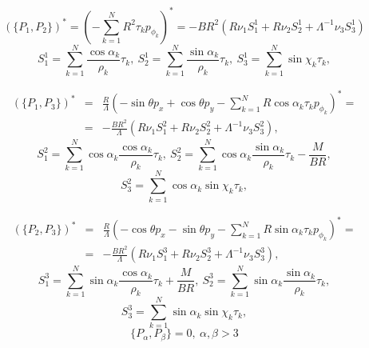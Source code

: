 $$
(\{P_1,P_2\})^* = (-\sum\limits_{k=1}^{N} R^2\tau_kp_{\phi_k})^* =
-BR^2(R\nu_1 S_1^1 + R\nu_2 S_2^1 + \Lambda^{-1}\nu_3S_3^1)$$
$$
S_1^1 = \sum\limits_{k=1}^{N}\frac{\cos\alpha_k}{\rho_k}\tau_k,\
S_2^1 = \sum\limits_{k=1}^{N}\frac{\sin\alpha_k}{\rho_k}\tau_k,\
S_3^1 = \sum\limits_{k=1}^{N}\sin\chi_k\tau_k,
$$

\begin{eqnarray*}
(\{P_1,P_3\})^* &=& \frac{R}{\Lambda}\left(-\sin\theta p_x + \cos\theta p_y - \sum\limits_{k=1}^{N} R\cos\alpha_k\tau_kp_{\phi_k}\right)^* =\\
&=& -\frac{BR^2}{\Lambda}(R\nu_1 S_1^2 + R\nu_2 S_2^2 + \Lambda^{-1}\nu_3S_3^2),
\end{eqnarray*}
$$
S_1^2 = \sum\limits_{k=1}^{N}\cos\alpha_k\frac{\cos\alpha_k}{\rho_k}\tau_k,\
S_2^2 = \sum\limits_{k=1}^{N}\cos\alpha_k\frac{\sin\alpha_k}{\rho_k}\tau_k - \frac{M}{BR},
$$$$
S_3^2 = \sum\limits_{k=1}^{N}\cos\alpha_k\sin\chi_k\tau_k,
$$

\begin{eqnarray*}
(\{P_2,P_3\})^* &=& \frac{R}{\Lambda}\left(-\cos\theta p_x - \sin\theta p_y - \sum\limits_{k=1}^{N} R\sin\alpha_k\tau_kp_{\phi_k}\right)^*  =\\
&=& -\frac{BR^2}{\Lambda}(R\nu_1 S_1^3 + R\nu_2 S_2^3 + \Lambda^{-1}\nu_3S_3^3),
\end{eqnarray*}
$$
S_1^3 = \sum\limits_{k=1}^{N}\sin\alpha_k\frac{\cos\alpha_k}{\rho_k}\tau_k + \frac{M}{BR},\
S_2^3 = \sum\limits_{k=1}^{N}\sin\alpha_k\frac{\sin\alpha_k}{\rho_k}\tau_k,
$$$$
S_3^3 = \sum\limits_{k=1}^{N}\sin\alpha_k\sin\chi_k\tau_k,
$$
$$
\{P_\alpha, P_\beta\} =0,\ \alpha,\beta >3
$$
